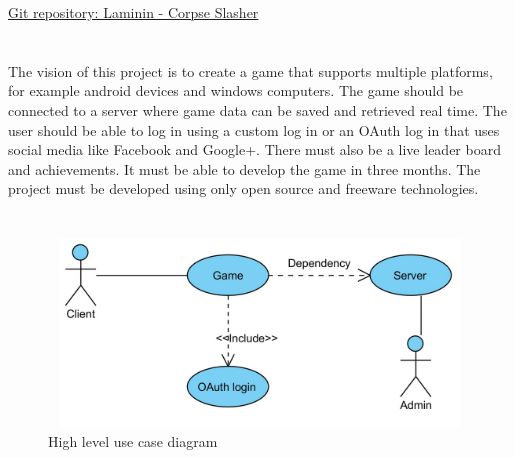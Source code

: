 \documentclass[letterpaper]{article}
\begin{document}
	\newpage
		\renewcommand\contentsname{TABLE OF CONTENTS}
		\newcommand\contentsnameLC{\colorbox{blue}{\makebox[\textwidth-2\fboxsep][l]{\bfseries\color{white} Table of Contents}}}
		
		\renewcommand{\cftdot}{}
		\hypersetup{linktocpage}
		\tableofcontents
		
		\begin{flushleft}
			\LARGE\href{https://github.com/njTaljaard/Laminin_CorpseSlasher/}{Git repository: Laminin - Corpse Slasher}
		\end{flushleft}
		
	\newpage
	
		\section*{\colorbox{blue}{}} 
		\vspace{0.2in}
		
		The vision of this project is to create a game that supports multiple platforms, for example android devices and windows computers. The game should be connected to a server where game data can be saved and retrieved real time. The user should be able to log in using a custom log in or an OAuth log in that uses social media like Facebook and Google+. There must also be a live leader board and achievements. It must be able to develop the game in three months. The project must be developed using only open source and freeware technologies.
					
		\section*{\colorbox{blue}{}} 
		
		\vspace{0.2in}
		
		\begin{figure}[ht!]
		\centering
		\includegraphics[width=180mm, height=50mm]{UML_Diagram/Use_Case/High_Level}
		\caption{High level use case diagram}
		\label{overflow}
		\end{figure}
		
\end{document}
